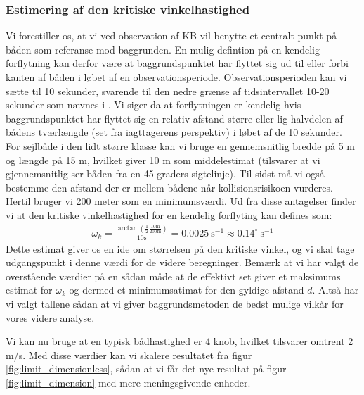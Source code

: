 \documentclass[%
 reprint,
nofootinbib,
aps,
]{revtex4-1}
\begin{document}
\subsubsection{Estimering af den kritiske vinkelhastighed}
Vi forestiller os, at vi ved observation af KB vil benytte et centralt punkt på båden som referanse mod baggrunden. En mulig defintion på en kendelig forflytning kan derfor være at baggrundspunktet har flyttet sig ud til eller forbi kanten af båden i løbet af en observationsperiode. Observationsperioden kan vi sætte til 10 sekunder, svarende til den nedre grænse af tidsintervallet 10-20 sekunder som nævnes i \cite{duelighed}. Vi siger da at forflytningen er kendelig hvis baggrundspunktet har flyttet sig en relativ afstand større eller lig halvdelen af bådens tværlængde (set fra iagttagerens perspektiv) i løbet af de 10 sekunder. For sejlbåde i den lidt større klasse kan vi bruge en gennemsnitlig bredde på 5 m og længde på 15 m, hvilket giver 10 m som middelestimat (tilsvarer at vi gjennemsnitlig ser båden fra en 45 graders sigtelinje). Til sidst må vi også bestemme den afstand der er mellem bådene når kollisionsrisikoen vurderes. Hertil bruger vi 200 meter som en minimumsværdi. Ud fra disse antagelser finder vi at den kritiske vinkelhastighed for en kendelig forflyting kan defines som:
\begin{align}
  \omega_k = \frac{\arctan{(\frac{1}{2}\frac{10 \text{m}}{200 \text{m}})}}{10 \text{s}} = 0.0025 \ \text{s}^{-1} \approx  0.14^{\circ}\ \text{s}^{-1}
  \label{eq:omega_k}
\end{align}
Dette estimat giver os en ide om størrelsen på den kritiske vinkel, og vi skal tage udgangspunkt i denne værdi for de videre beregninger. Bemærk at vi har valgt de overstående værdier på en sådan måde at de effektivt set giver et maksimums estimat for $\omega_k$ og dermed et minimumsatimat for den gyldige afstand $d$. Altså har vi valgt tallene sådan at vi giver baggrundsmetoden de bedst mulige vilkår for vores videre analyse. \par
%
Vi kan nu bruge at en typisk bådhastighed er 4 knob, hvilket tilsvarer omtrent 2 m/s. Med disse værdier kan vi skalere resultatet fra figur \ref{fig:limit_dimensionless}, sådan at vi får det nye resultat på figur \ref{fig:limit_dimension} med mere meningsgivende enheder.
\end{document}
